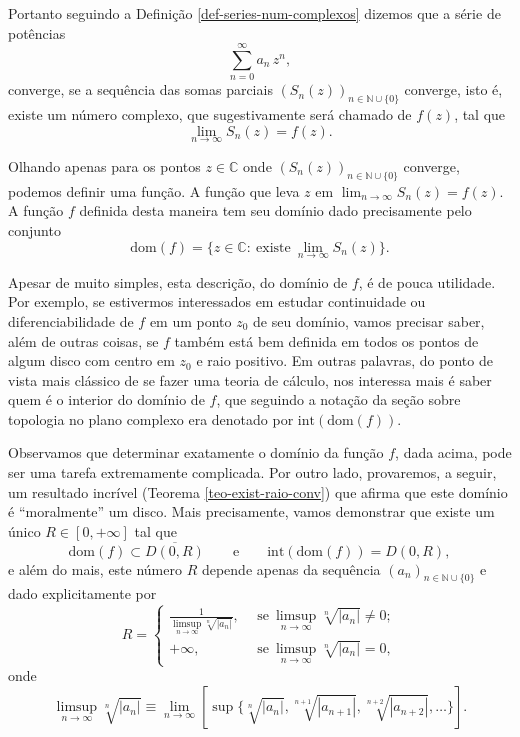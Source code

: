 Portanto seguindo a Definição \ref{def-series-num-complexos} dizemos que
a série de potências 
\[
\sum_{n=0}^{\infty} a_n\, z^n,
\]
converge, se a sequência das somas parciais $(S_n(z))_{n\in\mathbb{N}\cup\{0\}}$ 
converge, isto é, 
existe um número complexo, que sugestivamente será chamado de $f(z)$, tal que
\[
\lim_{n\to\infty} S_n(z) = f(z).
\]


Olhando apenas para os pontos $z\in\mathbb{C}$ 
onde $(S_n(z))_{n\in\mathbb{N}\cup\{0\}}$
converge, podemos definir uma função. A função que leva $z$ em 
$\lim_{n\to\infty}S_n(z)=f(z)$.
A função $f$ definida desta maneira tem seu domínio dado precisamente pelo conjunto 
\[
\mathrm{dom}(f) = 
\Big\{ z\in\mathbb{C} :  \ \text{existe} \ \lim_{n\to\infty}S_n(z)  \Big\}.
\]

Apesar de muito simples, esta descrição, do domínio de $f$, 
é de pouca utilidade. Por exemplo, se estivermos interessados
em estudar continuidade ou diferenciabilidade de $f$ 
em um ponto $z_0$ de seu domínio, vamos precisar
saber, além de outras coisas, se $f$ também está bem definida em todos os pontos de algum disco
com centro em $z_0$ e raio positivo. 
Em outras palavras, do ponto de vista mais clássico de
se fazer uma teoria de cálculo, nos interessa mais é saber quem é o interior 
do domínio de $f$, que seguindo a notação da seção sobre topologia no 
plano complexo era denotado por $\mathrm{int}(\mathrm{dom}(f))$.


\medskip 
Observamos que determinar exatamente o domínio da função $f$, dada acima,
pode ser uma tarefa extremamente complicada. 
Por outro lado, provaremos, a seguir, um resultado incrível 
(Teorema \ref{teo-exist-raio-conv})
que afirma que este domínio é ``moralmente'' 
um disco. 
Mais precisamente, vamos demonstrar que existe um único $R\in [0,+\infty]$ tal que
\[
\mathrm{dom}(f)\subset \overline{D(0,R)} 
\qquad \text{e} \qquad 
\mathrm{int}(\mathrm{dom}(f)) = D(0,R),
\]
e além do mais, este número $R$ depende apenas da sequência 
$(a _n)_{n\in\mathbb{N}\cup\{0\}}$ e dado explicitamente por
\[
R 
= 
\begin{cases}
\frac{1}{ \displaystyle\limsup_{n\to\infty} \sqrt[n]{|a_n|} },&
\ \ \text{se}\ \limsup_{n\to\infty} \sqrt[n]{|a_n|}\neq 0;
\\[1.0cm]
+\infty,&\ \ \text{se}\ \limsup_{n\to\infty} \sqrt[n]{|a_n|}=0,
\end{cases}
\]
onde 
\[
\limsup_{n\to\infty} \sqrt[n]{|a_n|}
\equiv 
\lim_{n\to\infty} \left[ \sup \Big\{ \sqrt[n]{|a_n|}, \sqrt[n+1]{|a_{n+1}|}, \sqrt[n+2]{|a_{n+2}|},\ldots  \Big\} \right].
\]

